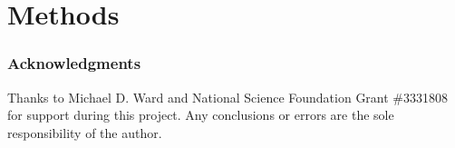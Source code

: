 \documentclass[12pt,letterpaper]{article} %
\begin{document}
\section{Methods}














\subsubsection*{Acknowledgments}

Thanks to Michael D. Ward and National Science Foundation Grant \#3331808 for support during this project. Any conclusions or errors are the sole responsibility of the author.
\end{document}
